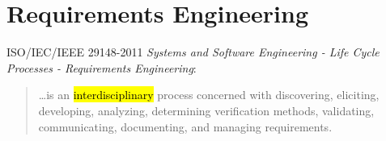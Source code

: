 \chapter{Requirements Engineering}

ISO/IEC/IEEE 29148-2011 {\em Systems and Software Engineering - Life Cycle Processes - Requirements Engineering}:
\begin{quote}

\ldots is an \hl{interdisciplinary} process
concerned with discovering, eliciting, developing, analyzing, determining
 verification methods, validating, communicating, documenting, and managing requirements.
\end{quote}
\newslide

